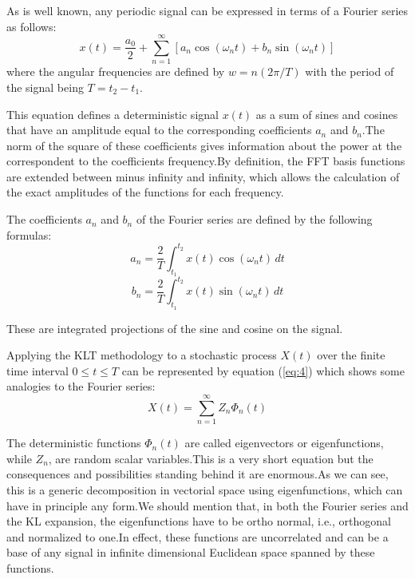 \documentclass[12pt]{report}
\begin{document}
As is well known, any periodic signal can be expressed in terms of a Fourier series as follows:
\begin{equation}
	x(t)=\frac{a_0}{2}+\sum_{n=1}^{\infty}[a_n\cos({\omega_n}t)+b_n\sin({\omega_n}t)]
\end{equation}\label{eq:1} 
where the angular frequencies are defined by \(w = n(2\pi/ T)\) with the period of the signal being \(T=t_2-t_1\).

This equation defines a deterministic signal \(x(t)\) as a sum of sines and cosines that have an amplitude equal to the corresponding coefficients \(a_n\) and \(b_n\).\@ The norm of the square of these coefficients gives information about the power at the correspondent to the coefficients frequency.\@ By definition, the FFT basis functions are extended between minus infinity and infinity, which allows the calculation of the exact amplitudes of the functions for each frequency.

The coefficients \(a_n\) and \(b_n\) of the Fourier series are defined by the following formulas:
\begin{equation}
	a_n=\frac{2}{T}\int_{t_1}^{t_2}x(t)\cos({\omega_n}t)\,dt
	\label{eq:2}
\end{equation}
\begin{equation}
	b_n=\frac{2}{T}\int_{t_1}^{t_2}x(t)\sin({\omega_n}t)\,dt
	\label{eq:3}
\end{equation}

These are integrated projections of the sine and cosine on the signal.

Applying the KLT methodology to a stochastic process \(X(t)\) over the finite time interval $0 \leq t \leq T$ can be represented by equation (\ref{eq:4}) which shows some analogies to the Fourier series:
\begin{equation}
	X(t)=\sum_{n=1}^{\infty}Z_n\Phi_n(t)
	\label{eq:4}
\end{equation}

The deterministic functions $\Phi_n(t)$ are called eigenvectors or eigenfunctions, while $Z_n$, are random scalar variables.\@ This is a very short equation but the consequences and possibilities standing behind it are enormous.\@ As we can see, this is a generic decomposition in vectorial space using eigenfunctions,
which can have in principle any form.\@ We should mention that, in both the Fourier series and the KL expansion, the eigenfunctions have to be ortho normal, i.e., orthogonal and normalized to one.\@ In effect, these functions are uncorrelated and can be a base of any
signal in infinite dimensional Euclidean space spanned by these functions.
\end{document}
